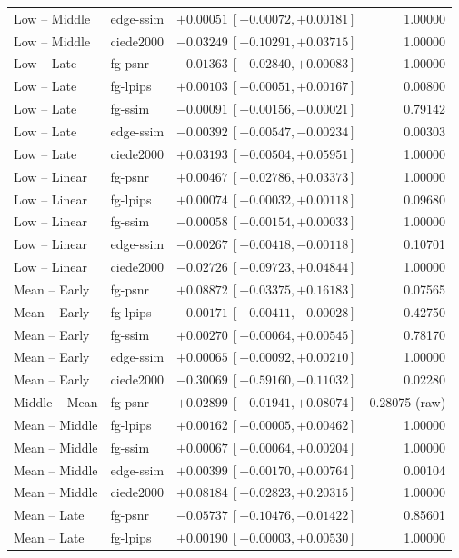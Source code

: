 \documentclass[11pt]{article}
\begin{document}
\begin{longtable}{llrr}
Low -- Middle & edge-ssim & $+0.00051\ [-0.00072,+0.00181]$ & 1.00000 \\
Low -- Middle & ciede2000 & $-0.03249\ [-0.10291,+0.03715]$ & 1.00000 \\
Low -- Late & fg-psnr & $-0.01363\ [-0.02840,+0.00083]$ & 1.00000 \\
Low -- Late & fg-lpips & $+0.00103\ [+0.00051,+0.00167]$ & 0.00800 \\
Low -- Late & fg-ssim & $-0.00091\ [-0.00156,-0.00021]$ & 0.79142 \\
Low -- Late & edge-ssim & $-0.00392\ [-0.00547,-0.00234]$ & 0.00303 \\
Low -- Late & ciede2000 & $+0.03193\ [+0.00504,+0.05951]$ & 1.00000 \\
Low -- Linear & fg-psnr & $+0.00467\ [-0.02786,+0.03373]$ & 1.00000 \\
Low -- Linear & fg-lpips & $+0.00074\ [+0.00032,+0.00118]$ & 0.09680 \\
Low -- Linear & fg-ssim & $-0.00058\ [-0.00154,+0.00033]$ & 1.00000 \\
Low -- Linear & edge-ssim & $-0.00267\ [-0.00418,-0.00118]$ & 0.10701 \\
Low -- Linear & ciede2000 & $-0.02726\ [-0.09723,+0.04844]$ & 1.00000 \\
Mean -- Early & fg-psnr & $+0.08872\ [+0.03375,+0.16183]$ & 0.07565 \\
Mean -- Early & fg-lpips & $-0.00171\ [-0.00411,-0.00028]$ & 0.42750 \\
Mean -- Early & fg-ssim & $+0.00270\ [+0.00064,+0.00545]$ & 0.78170 \\
Mean -- Early & edge-ssim & $+0.00065\ [-0.00092,+0.00210]$ & 1.00000 \\
Mean -- Early & ciede2000 & $-0.30069\ [-0.59160,-0.11032]$ & 0.02280 \\
Middle -- Mean & fg-psnr & $+0.02899\ [-0.01941,+0.08074]$ & 0.28075 (raw) \\
Mean -- Middle & fg-lpips & $+0.00162\ [-0.00005,+0.00462]$ & 1.00000 \\
Mean -- Middle & fg-ssim & $+0.00067\ [-0.00064,+0.00204]$ & 1.00000 \\
Mean -- Middle & edge-ssim & $+0.00399\ [+0.00170,+0.00764]$ & 0.00104 \\
Mean -- Middle & ciede2000 & $+0.08184\ [-0.02823,+0.20315]$ & 1.00000 \\
Mean -- Late & fg-psnr & $-0.05737\ [-0.10476,-0.01422]$ & 0.85601 \\
Mean -- Late & fg-lpips & $+0.00190\ [-0.00003,+0.00530]$ & 1.00000 \\

\end{longtable}
\end{document}
